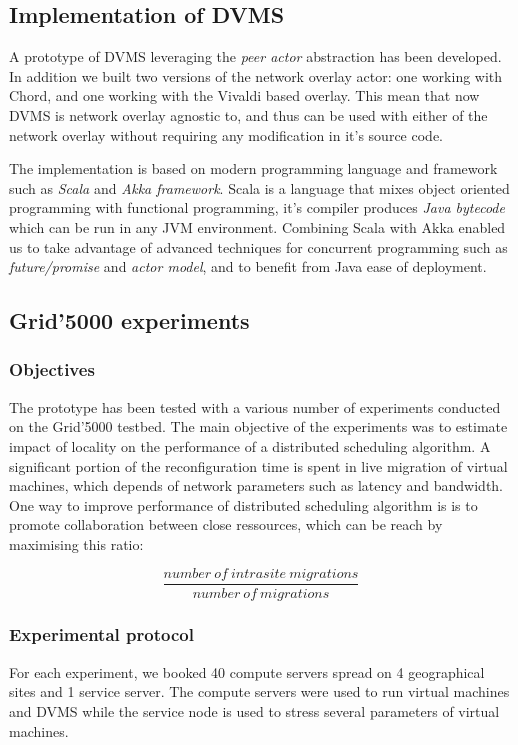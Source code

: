 \subsection{Implementation of DVMS}

A prototype of DVMS leveraging the \emph{peer actor} abstraction has been 
developed. In addition we built two versions of the network overlay actor: one 
working with Chord, and one working with the Vivaldi based overlay. This mean 
that now DVMS is network overlay agnostic to, and thus can be used with either
of the network overlay without requiring any modification in it's source code.

The implementation is based on modern programming language and framework such as 
\emph{Scala} and \emph{Akka framework}. Scala is a language that mixes object
oriented programming with functional programming, it's compiler produces 
\emph{Java bytecode} which can be run in any JVM environment. Combining Scala 
with Akka enabled us to take advantage of advanced techniques for concurrent 
programming such as \emph{future/promise} and \emph{actor model}, and to benefit
from Java ease of deployment.



\subsection{Grid'5000 experiments}


\subsubsection{Objectives}
The prototype has been tested with a various number of experiments conducted on
the Grid'5000 testbed. The main objective of the experiments was to estimate
impact of locality on the performance of a distributed scheduling algorithm. 
A significant portion of the reconfiguration time is spent in live migration of
virtual machines, which depends of network parameters such as latency and
bandwidth. One way to improve performance of distributed scheduling algorithm is
is to promote collaboration between close ressources, which can be reach by 
maximising this ratio:

\[
	\frac{number\ of\ intrasite\ migrations}{number\ of\ migrations}
\]

\subsubsection{Experimental protocol}
For each experiment, we booked 40 compute servers spread on 4 geographical sites
and 1 service server. The compute servers were used to run virtual machines and
DVMS while the service node is used to stress several parameters of 
virtual machines.


